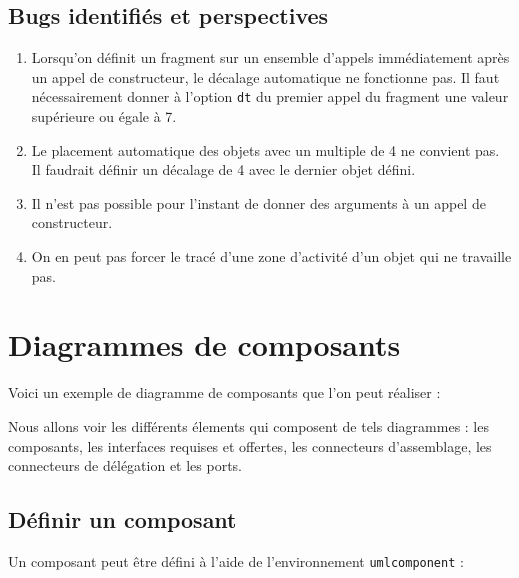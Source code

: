 \documentclass[a4paper,11pt]{report}
\newcommand{\inputTikZ}[1]{%
  }%
\newcommand{\inputTikZ}[1]{%
    \texttt{[image: fig/\#1.pdf]}%
  }%
\begin{document}
\begin{center}
\inputTikZ{seqdiagstep4}
\end{center}

\section{Bugs identifiés et perspectives}\label{s.seqbug}

\begin{enumerate}
\item Lorsqu'on définit un fragment sur un ensemble d'appels immédiatement après un appel de constructeur, le décalage automatique ne fonctionne pas. Il faut nécessairement donner à l'option {\tt dt} du premier appel du fragment une valeur supérieure ou égale à 7.
\item Le placement automatique des objets avec un multiple de 4 ne convient pas. Il faudrait définir un décalage de 4 avec le dernier objet défini.
\item Il n'est pas possible pour l'instant de donner des arguments à un appel de constructeur.
\item On en peut pas forcer le tracé d'une zone d'activité d'un objet qui ne \og travaille\fg{} pas.

\begin{center}
\inputTikZ{bugcall}
\end{center}

\end{enumerate}

\chapter{Diagrammes de composants}

Voici un exemple de diagramme de composants que l'on peut réaliser :

\begin{center}
\inputTikZ{compdiagex}
\end{center}

Nous allons voir les différents élements qui composent de tels diagrammes : les composants, les interfaces requises et offertes, les connecteurs d'assemblage, les connecteurs de délégation et les ports.

\section{Définir un composant}

Un composant peut être défini à l'aide de l'environnement {\tt umlcomponent} :  
\end{document}
